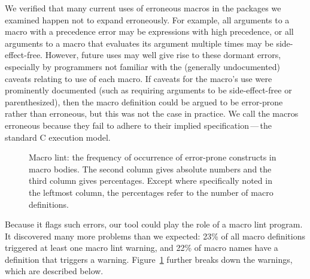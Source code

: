 \documentclass[10pt]{article}
\newcommand{\captionsmall}[1]{\caption[]{\small #1}}
\begin{document}
We verified that many current uses of erroneous macros in the packages we
examined happen not to expand erroneously.  For example, all arguments to a
macro with a precedence error may be expressions with high precedence, or
all arguments to a macro that evaluates its argument multiple times may be
side-effect-free.  However, future uses may well give rise to these dormant
errors, especially by programmers not familiar with the (generally
undocumented) caveats relating to use of each macro.  If caveats for the
macro's use were prominently documented (such as requiring arguments to be
side-effect-free or parenthesized), then the macro definition could be
argued to be error-prone rather than erroneous, but this was not the case
in practice.  We call the macros erroneous because they fail to adhere to
their implied specification\,---\,the standard C execution model.


\begin{figure}
  {\small\centerline{}}
  
  \captionsmall{Macro lint:  the frequency of occurrence of error-prone
    constructs in macro bodies.  The second column gives absolute numbers
    and the third column gives percentages.  Except where specifically
    noted in the leftmost column, the percentages refer to the number of macro definitions.}
  \label{fig:macro-lint}
\end{figure}


Because it flags such errors, our tool could play the role of a macro lint
program.  It discovered many more problems than we expected: 23\% of all
macro definitions triggered at least one macro lint warning, and 22\% of
macro names have a definition that triggers a warning.
Figure~\ref{fig:macro-lint} further breaks down the warnings, which are
described below.
\end{document}
